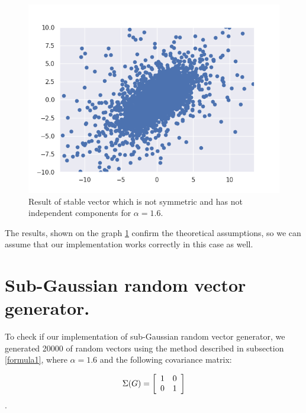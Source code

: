 \documentclass{article}
\begin{document}
	\begin{figure}[H]
		\centering
		\includegraphics[width=1\linewidth]{images/ex_1_c_alpha_stable_vector_simulation_symmetric_discreet_scatter}
		\caption{Result of stable vector which is not symmetric and has not independent components for $\alpha=1.6$.}\label{3}
	\end{figure}
	The results, shown on the graph \ref{3} confirm the theoretical assumptions, so we can assume that our implementation works correctly in this case as well.
	
	\section{Sub-Gaussian random vector generator.}\label{sec2}
	
	To check if our implementation of sub-Gaussian random vector generator, we generated 20000 of random vectors using the method described in subsection \ref{formula1}, where $\alpha = 1.6$ and the following covariance matrix:
	
	\[\Sigma(G) = \left[{\begin{array}{*{20}c}
			1 & 0\\
			0 & 1\end{array} } \right]\]. 
	
\end{document}
